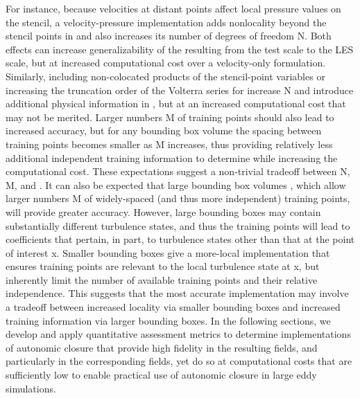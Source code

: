 For instance, because velocities at distant points affect local pressure values on the stencil, a velocity-pressure implementation adds nonlocality beyond the stencil points in   and also increases its number of degrees of freedom N. Both effects can increase generalizability of the resulting   from the test scale to the LES scale, but at increased computational cost over a velocity-only formulation. Similarly, including non-colocated products of the stencil-point variables or increasing the truncation order of the Volterra series for   increase N and introduce additional physical information in  , but at an increased computational cost that may not be merited. Larger numbers M of training points should also lead to increased accuracy, but for any bounding box volume   the spacing   between training points becomes smaller as M increases, thus providing relatively less additional independent training information to determine   while increasing the computational cost. These expectations suggest a non-trivial tradeoff between N, M, and  .  
It can also be expected that large bounding box volumes  , which allow larger numbers M of widely-spaced (and thus more independent) training points, will provide greater accuracy. However, large bounding boxes may contain substantially different turbulence states, and thus the training points will lead to coefficients   that pertain, in part, to turbulence states other than that at the point of interest x. Smaller bounding boxes give a more-local implementation that ensures training points are relevant to the local turbulence state at x, but inherently limit the number of available training points and their relative independence. This suggests that the most accurate implementation may involve a tradeoff between increased locality via smaller bounding boxes and increased training information via larger bounding boxes. 
In the following sections, we develop and apply quantitative assessment metrics to determine implementations of autonomic closure that provide high fidelity in the resulting   fields, and particularly in the corresponding   fields, yet do so at computational costs that are sufficiently low to enable practical use of autonomic closure in large eddy simulations. 
